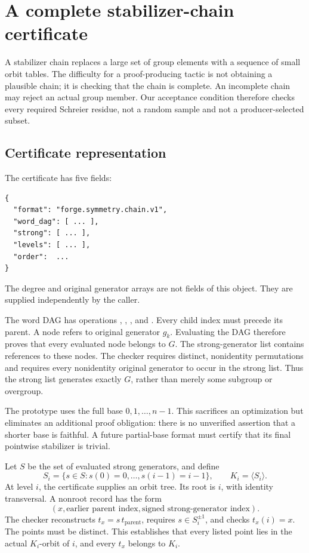\section{A complete stabilizer-chain certificate}
\label{sec:chain}
A stabilizer chain replaces a large set of group elements with a sequence of small orbit tables. The difficulty for a proof-producing tactic is not obtaining a plausible chain; it is checking that the chain is complete. An incomplete chain may reject an actual group member. Our acceptance condition therefore checks every required Schreier residue, not a random sample and not a producer-selected subset.

\subsection{Certificate representation}
The certificate has five fields:
\begin{lstlisting}
{
  "format": "forge.symmetry.chain.v1",
  "word_dag": [ ... ],
  "strong": [ ... ],
  "levels": [ ... ],
  "order":  ...
}
\end{lstlisting}
The degree and original generator arrays are not fields of this object. They are supplied independently by the caller.

The word DAG has operations , , , and . Every child index must precede its parent. A  node refers to original generator $g_k$. Evaluating the DAG therefore proves that every evaluated node belongs to $G$. The strong-generator list contains references to these nodes. The checker requires distinct, nonidentity permutations and requires every nonidentity original generator to occur in the strong list. Thus the strong list generates exactly $G$, rather than merely some subgroup or overgroup.

The prototype uses the full base $0,1,\ldots,n-1$. This sacrifices an optimization but eliminates an additional proof obligation: there is no unverified assertion that a shorter base is faithful. A future partial-base format must certify that its final pointwise stabilizer is trivial.

Let $S$ be the set of evaluated strong generators, and define
\[
 S_i=\{s\in S:s(0)=0,\ldots,s(i-1)=i-1\},\qquad K_i=\langle S_i\rangle.
\]
At level $i$, the certificate supplies an orbit tree. Its root is $i$, with identity transversal. A nonroot record has the form
\[
  (x,\text{earlier parent index},\text{signed strong-generator index}).
\]
The checker reconstructs $t_x=s\,t_{\mathrm{parent}}$, requires $s\in S_i^{\pm1}$, and checks $t_x(i)=x$. The points must be distinct. This establishes that every listed point lies in the actual $K_i$-orbit of $i$, and every $t_x$ belongs to $K_i$.

